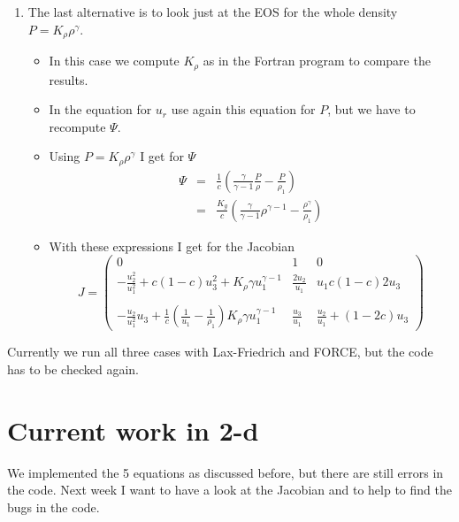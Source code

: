 \documentclass{article}
\begin{document}
\begin{enumerate}
\item The last alternative is to look just at the EOS for the whole
  density $P = K_\rho \rho^{\gamma}$.
  \begin{itemize}
    \item In this case we compute $K_\rho$ as in the Fortran program
      to compare the results.
    \item In the equation for $u_r$ use again this equation for $P$,
      but we have to recompute $\Psi$.
    \item Using $P = K_\rho \rho^{\gamma}$ I get for $\Psi$
      \begin{eqnarray}
        \Psi &=& \frac{1}{c}\left(\frac{\gamma}{\gamma-1} \frac{P}{\rho} -
        \frac{P}{\rho_1}\right)\\
        &=& \frac{K_g}{c}\left(\frac{\gamma}{\gamma-1} \rho^{\gamma-1} -
        \frac{ \rho^{\gamma}}{\rho_1}\right)\label{eq:ur_Psi_2_rho}
      \end{eqnarray}
    \item With these expressions I get for the Jacobian
      \begin{equation}
        J = \left(\begin{array}{ccc}
          0 & 1 & 0\\
          - \frac{u_2^2}{u_1^2} + c (1-c) u_3^2  + K_\rho \gamma u_1^{\gamma-1}
          & \frac{2 u_2}{u_1}  &  
          u_1 c (1-c) 2 u_3  \\
          \\
          - \frac{u_2}{u_1^2} u_3 +
          \frac{1}{c}\left(\frac{1}{u_1}-\frac{1}{\rho_1} \right)
          K_\rho \gamma u_1^{\gamma-1}
          &   \frac{u_3}{u_1}  &  
          \frac{u_2}{u_1} + (1-2c) u_3 
        \end{array}\right)\label{eq:jacobi_v3}
      \end{equation}
  \end{itemize}
  
\end{enumerate}

Currently we run all three cases with Lax-Friedrich and FORCE, but the
code has to be checked again.

\section{Current work in 2-d}

We implemented the 5 equations as discussed before, but there are
still errors in the code. Next week I want to have a look at the
Jacobian and to help to find the bugs in the code.

\end{document}
